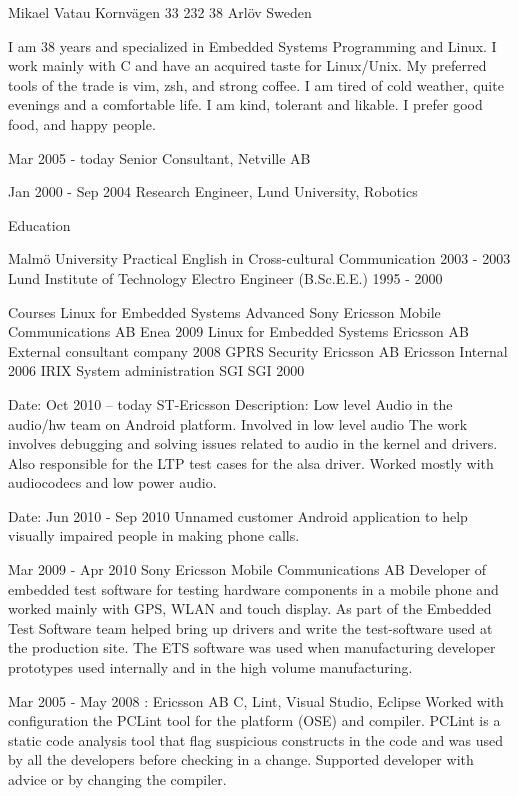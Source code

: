 \documentclass[a4paper]{article}
\begin{document}
Mikael Vatau
Kornvägen 33
232 38  Arlöv
Sweden


I am 38 years and specialized in Embedded Systems Programming and Linux. I work mainly with C and have an acquired taste for Linux/Unix. My preferred tools of the trade is vim, zsh, and strong coffee. I am tired of cold weather, quite evenings and a comfortable life. I am kind, tolerant and likable. I prefer good food, and happy people. 

Mar 2005 - today
Senior Consultant, Netville AB

Jan 2000 - Sep 2004
Research Engineer, Lund University, Robotics


Education

Malmö University	Practical English in Cross-cultural Communication	2003 - 2003			
Lund Institute of Technology	Electro Engineer (B.Sc.E.E.)	1995 - 2000			

Courses
Linux for Embedded Systems Advanced	Sony Ericsson Mobile Communications AB	Enea	2009		
Linux for Embedded Systems	            Ericsson AB	External consultant company	     	2008		
GPRS Security				Ericsson AB	Ericsson Internal			2006	
IRIX System administration	SGI		SGI							2000



Date: 	Oct 2010 – today
ST-Ericsson
Description: 	Low level Audio in the audio/hw team on Android platform. Involved in low level audio  The work involves debugging and solving issues related to audio in the kernel and drivers. Also responsible for the LTP test cases for the alsa driver. Worked mostly with audiocodecs and low power audio.

Date: 	Jun 2010 - Sep 2010
Unnamed customer
Android application to help visually impaired people in making phone calls. 

 
Mar 2009 - Apr 2010
Sony Ericsson Mobile Communications AB		
Developer of embedded test software for testing hardware components in a mobile phone and worked mainly with GPS, WLAN and touch display. As part of the Embedded Test Software team helped bring up drivers and write the test-software used at the production site. The ETS software was used  when manufacturing developer prototypes used internally and in the high volume manufacturing.
 
Mar 2005 - May 2008	: 
Ericsson AB	
C, Lint, Visual Studio, Eclipse
Worked with configuration the PCLint tool for the platform (OSE) and compiler. PCLint is a static code analysis tool that flag suspicious constructs in the code and was used by all the developers before checking in a change. Supported developer with advice or by changing the compiler.
\end{document}
